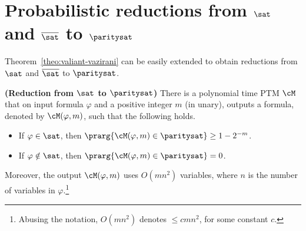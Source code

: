 \documentclass[11pt, a4paper]{article}
\begin{document}
\section{Probabilistic reductions from $\sat$ and $\overline{\sat}$ to $\paritysat$}

Theorem~\ref{theo:valiant-vazirani} can be easily extended
to obtain reductions from $\sat$ and $\overline{\sat}$ to $\paritysat$.


\begin{lemma}
\label{lem:sat-to-paritysat}
{\bf (Reduction from $\sat$ to $\paritysat$)}
There is a polynomial time PTM $\cM$ 
that on input formula $\varphi$ and a positive integer $m$ (in unary), 
outputs a formula, denoted by $\cM(\varphi,m)$, such that the following holds.
\begin{itemize}
\item
If $\varphi \in \sat$, then $\prarg {\cM(\varphi,m)\in\paritysat} \geq 1-2^{-m}$.
\item
If $\varphi\notin \sat$, then $\prarg {\cM(\varphi,m)\in \paritysat} =0$.
\end{itemize}
Moreover, the output $\cM(\varphi,m)$ uses $O(mn^2)$ variables,
where $n$ is the number of variables in $\varphi$.\footnote{Abusing the notation, $O(mn^2)$ denotes $\leq cmn^2$, for some constant $c$.}
\end{lemma}
\end{document}
